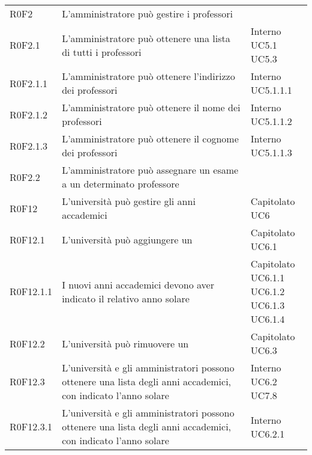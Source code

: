 \documentclass[AnalisiDeiRequisiti.tex]{subfiles}
\begin{document}
\begin{longtable}[H]{p{2cm}p{5.2cm}p{5cm}}
	R0F2 & L'amministratore può gestire i professori & \makecell[tl]{
		Interno
	} \\
	R0F2.1 & L'amministratore può ottenere una lista di tutti i professori & \makecell[tl]{
		Interno \\ 
		UC5.1 \\
		UC5.3 
	} \\
	R0F2.1.1 & L'amministratore può ottenere l'indirizzo dei professori & \makecell[tl]{
		Interno \\ 
		UC5.1.1.1
	} \\
	R0F2.1.2 & L'amministratore può ottenere il nome dei professori & \makecell[tl]{
		Interno \\ 
		UC5.1.1.2
	} \\
	R0F2.1.3 & L'amministratore può ottenere il cognome dei professori & \makecell[tl]{
		Interno \\ 
		UC5.1.1.3
	} \\
	R0F2.2 & L'amministratore può assegnare un esame a un determinato professore & \makecell[tl]{
		Capitolato
	} \\
	R0F12& L'università può gestire gli anni accademici & \makecell[tl]{
		Capitolato \\ 
		UC6
	} \\
	R0F12.1 & L'università può aggiungere un \citGloss{anno accademico} & \makecell[tl]{
		Capitolato \\ 
		UC6.1 \\ 
	} \\
	R0F12.1.1 & I nuovi anni accademici devono aver indicato il relativo anno solare  & \makecell[tl]{
		Capitolato \\ 
		UC6.1.1 \\
		UC6.1.2 \\ 
		UC6.1.3
		UC6.1.4
	} \\
	R0F12.2 & L'università può rimuovere un \citGloss{anno accademico} & \makecell[tl]{
	Capitolato \\ 
	UC6.3
	} \\
	R0F12.3 &  L'università e gli amministratori possono ottenere una lista degli anni accademici, con indicato l'anno solare & \makecell[tl]{
		Interno \\ 
		UC6.2 \\
		UC7.8
	} \\ 
	R0F12.3.1 &  L'università e gli amministratori possono ottenere una lista degli anni accademici, con indicato l'anno solare & \makecell[tl]{
	Interno \\ 
	UC6.2.1 \\
}
\end{longtable}
\end{document}
